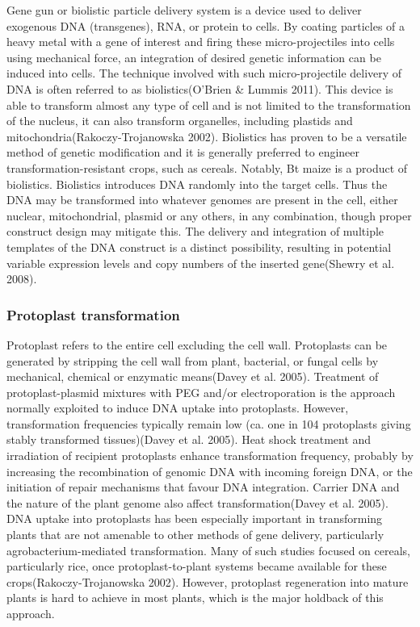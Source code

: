 \documentclass[
]{article}
\begin{document}
Gene gun or biolistic particle delivery system is a device used to
deliver exogenous DNA (transgenes), RNA, or protein to cells. By coating
particles of a heavy metal with a gene of interest and firing these
micro-projectiles into cells using mechanical force, an integration of
desired genetic information can be induced into cells. The technique
involved with such micro-projectile delivery of DNA is often referred to
as biolistics(O'Brien \& Lummis 2011). This device is able to transform
almost any type of cell and is not limited to the transformation of the
nucleus, it can also transform organelles, including plastids and
mitochondria(Rakoczy-Trojanowska 2002). Biolistics has proven to be a
versatile method of genetic modification and it is generally preferred
to engineer transformation-resistant crops, such as cereals. Notably, Bt
maize is a product of biolistics. Biolistics introduces DNA randomly
into the target cells. Thus the DNA may be transformed into whatever
genomes are present in the cell, either nuclear, mitochondrial, plasmid
or any others, in any combination, though proper construct design may
mitigate this. The delivery and integration of multiple templates of the
DNA construct is a distinct possibility, resulting in potential variable
expression levels and copy numbers of the inserted gene(Shewry et al.
2008).

\hypertarget{protoplast-transformation}{%
\subsubsection{Protoplast
transformation}\label{protoplast-transformation}}

Protoplast refers to the entire cell excluding the cell wall.
Protoplasts can be generated by stripping the cell wall from plant,
bacterial, or fungal cells by mechanical, chemical or enzymatic
means(Davey et al. 2005). Treatment of protoplast-plasmid mixtures with
PEG and/or electroporation is the approach normally exploited to induce
DNA uptake into protoplasts. However, transformation frequencies
typically remain low (ca. one in 104 protoplasts giving stably
transformed tissues)(Davey et al. 2005). Heat shock treatment and
irradiation of recipient protoplasts enhance transformation frequency,
probably by increasing the recombination of genomic DNA with incoming
foreign DNA, or the initiation of repair mechanisms that favour DNA
integration. Carrier DNA and the nature of the plant genome also affect
transformation(Davey et al. 2005). DNA uptake into protoplasts has been
especially important in transforming plants that are not amenable to
other methods of gene delivery, particularly agrobacterium-mediated
transformation. Many of such studies focused on cereals, particularly
rice, once protoplast-to-plant systems became available for these
crops(Rakoczy-Trojanowska 2002). However, protoplast regeneration into
mature plants is hard to achieve in most plants, which is the major
holdback of this approach.
\end{document}
